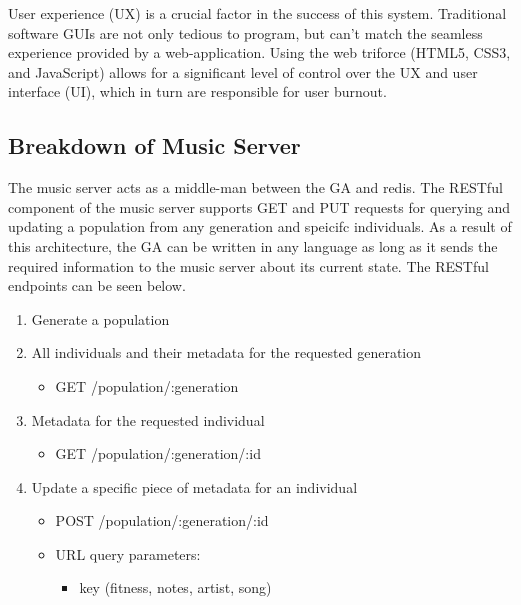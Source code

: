 \documentclass[12pt]{article} %
\begin{document}
User experience (UX) is a crucial factor in the success of this system. Traditional software GUIs are not only tedious to program, but can’t match the seamless experience provided by a web-application. Using the web triforce (HTML5, CSS3, and JavaScript) allows for a significant level of control over the UX and user interface (UI), which in turn are responsible for user burnout.

\subsection{Breakdown of Music Server}
The music server acts as a middle-man between the GA and redis. The RESTful component of the music server supports GET and PUT requests for querying and updating a population from any generation and speicifc individuals. As a result of this architecture, the GA can be written in any language as long as it sends the required information to the music server about its current state. The RESTful endpoints can be seen below. 

\begin{enumerate}
\item Generate a population 
\item All individuals and their metadata for the requested generation
\begin{itemize}
\item GET /population/:generation
\end{itemize}
\item Metadata for the requested individual
\begin{itemize}
\item GET /population/:generation/:id
\end{itemize}
\item Update a specific piece of metadata for an individual
\begin{itemize}
\item POST /population/:generation/:id
\item URL query parameters:
	\begin{itemize}
		\item key (fitness, notes, artist, song)
	\end{itemize}
\end{itemize}
\end{enumerate}
\end{document}
